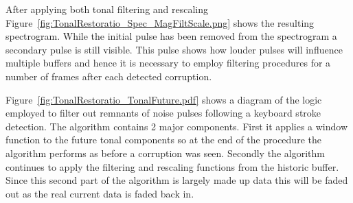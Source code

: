 After applying both tonal filtering and rescaling Figure~\ref{fig:TonalRestoratio_Spec_MagFiltScale.png} shows the resulting spectrogram. While the initial pulse has been removed from the spectrogram a secondary pulse is still visible. This pulse shows how louder pulses will influence multiple buffers and hence it is necessary to employ filtering procedures for a number of frames after each detected corruption.

Figure~\ref{fig:TonalRestoratio_TonalFuture.pdf} shows a diagram of the logic employed to filter out remnants of noise pulses following a keyboard stroke detection. The algorithm contains 2 major components. First it applies a window function to the future tonal components so at the end of the procedure the algorithm performs as before a corruption was seen. Secondly the algorithm continues to apply the filtering and rescaling functions from the historic buffer. Since this second part of the algorithm is largely made up data this will be faded out as the real current data is faded back in.

